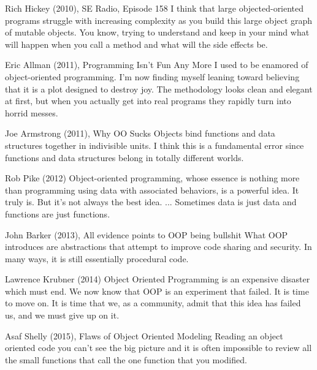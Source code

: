 \documentclass[12pt]{book}
\begin{document}
\begin{kodequote}{Rich Hickey (2010), SE Radio, Episode 158}
	I think that large objected-oriented programs struggle with increasing complexity as you build this large object graph of mutable objects. You know, trying to understand and keep in your mind what will happen when you call a method and what will the side effects be.
\end{kodequote}

\begin{kodequote}{Eric Allman (2011), Programming Isn't Fun Any More}
	I used to be enamored of object-oriented programming. I'm now finding myself leaning toward believing that it is a plot designed to destroy joy. The methodology looks clean and elegant at first, but when you actually get into real programs they rapidly turn into horrid messes.
\end{kodequote}

\begin{kodequote}{Joe Armstrong (2011), Why OO Sucks}
	Objects bind functions and data structures together in indivisible units. I think this is a fundamental error since functions and data structures belong in totally different worlds.
\end{kodequote}

\begin{kodequote}{Rob Pike (2012)}
	Object-oriented programming, whose essence is nothing more than programming using data with associated behaviors, is a powerful idea. It truly is. But it's not always the best idea. ... Sometimes data is just data and functions are just functions.
\end{kodequote}

\begin{kodequote}{John Barker (2013), All evidence points to OOP being bullshit}
	What OOP introduces are abstractions that attempt to improve code sharing and security. In many ways, it is still essentially procedural code.
\end{kodequote}

\begin{kodequote}{Lawrence Krubner (2014)}
	Object Oriented Programming is an expensive disaster which must end. 
	We now know that OOP is an experiment that failed. It is time to move on. It is time that we, as a community, admit that this idea has failed us, and we must give up on it.
\end{kodequote}

\begin{kodequote}{Asaf Shelly (2015), Flaws of Object Oriented Modeling}
	Reading an object oriented code you can't see the big picture and it is often impossible to review all the small functions that call the one function that you modified.
\end{kodequote}
\end{document}
